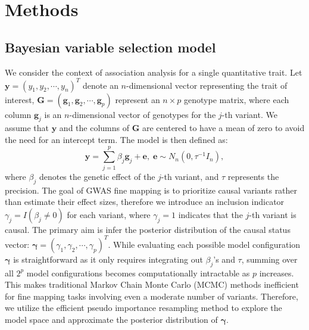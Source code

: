 \documentclass[pdflatex,sn-mathphys-num]{sn-jnl}%
\theoremstyle{thmstyleone}%
\theoremstyle{thmstyletwo}%
\theoremstyle{thmstylethree}%
\begin{document}
\newpage
\section{Methods}\label{sec4}
\subsection{Bayesian variable selection model}
We consider the context of association analysis for a single quantitative trait. Let $\mathbf{y}=\left(y_1,y_2,\cdots,y_n\right)^T$ denote an $n$-dimensional vector representing the trait of interest, $\mathbf{G} = \left(\mathbf{g}_1,\mathbf{g}_2,\cdots,\mathbf{g}_p\right)$ represent an $n \times p$ genotype matrix, where each column $\mathbf{g}_j$ is an $n$-dimensional vector of genotypes for the $j$-th variant. We assume that $\mathbf{y}$ and the columns of $\mathbf{G}$ are centered to have a mean of zero to avoid the need for an intercept term. The model is then defined as:
\begin{equation}
    \mathbf{y} = \sum_{j=1}^{p} \beta_j \mathbf{g}_j  + \mathbf{e}, \; \mathbf{e} \sim N_n\left(0, \tau^{-1}I_n\right),
\end{equation}
where $\beta_j$ denotes the genetic effect of the $j$-th variant, and $\tau$ represents the precision. The goal of GWAS fine mapping is to prioritize causal variants rather than estimate their effect sizes, therefore we introduce an inclusion indicator $\gamma_j = I(\beta_j \neq 0)$ for each variant, where $\gamma_j=1$ indicates that the $j$-th variant is causal. The primary aim is infer the posterior distribution of the causal status vector: $\boldsymbol{\gamma} = \left(\gamma_1,\gamma_2,\cdots,\gamma_p\right)^T$. While evaluating each possible model configuration $\boldsymbol{\gamma}$ is straightforward as it only requires integrating out $\beta_j$'s and $\tau$, summing over all $2^p$ model configurations becomes computationally intractable as $p$ increases. This makes traditional Markov Chain Monte Carlo (MCMC) methods inefficient for fine mapping tasks involving even a moderate number of variants. Therefore, we utilize the efficient pseudo importance resampling method to explore the model space and approximate the posterior distribution of $\boldsymbol{\gamma}$.
\end{document}

